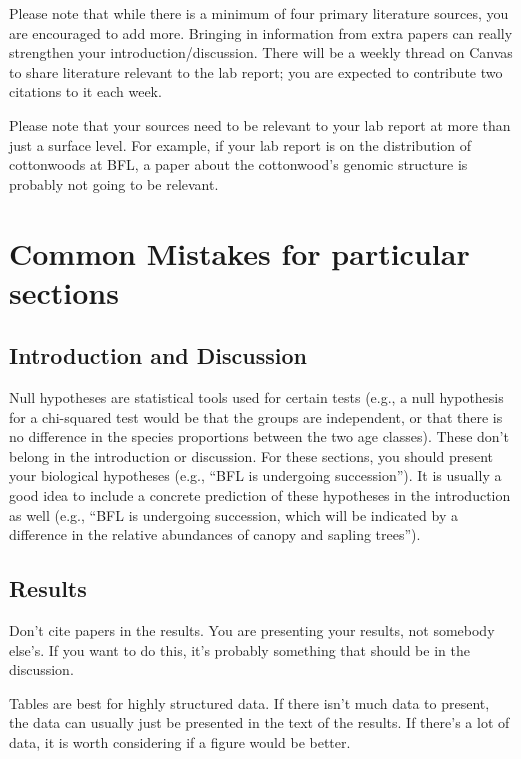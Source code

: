 \documentclass[]{book}
\begin{document}
Please note that while there is a minimum of four primary literature
sources, you are encouraged to add more. Bringing in information from
extra papers can really strengthen your introduction/discussion. There
will be a weekly thread on Canvas to share literature relevant to the
lab report; you are expected to contribute two citations to it each
week.

Please note that your sources need to be relevant to your lab report at
more than just a surface level. For example, if your lab report is on
the distribution of cottonwoods at BFL, a paper about the cottonwood's
genomic structure is probably not going to be relevant.

\section{Common Mistakes for particular
sections}\label{common-mistakes-for-particular-sections}

\subsection{Introduction and
Discussion}\label{introduction-and-discussion}

Null hypotheses are statistical tools used for certain tests (e.g., a
null hypothesis for a chi-squared test would be that the groups are
independent, or that there is no difference in the species proportions
between the two age classes). These don't belong in the introduction or
discussion. For these sections, you should present your biological
hypotheses (e.g., ``BFL is undergoing succession''). It is usually a
good idea to include a concrete prediction of these hypotheses in the
introduction as well (e.g., ``BFL is undergoing succession, which will
be indicated by a difference in the relative abundances of canopy and
sapling trees'').

\subsection{Results}\label{results-1}

Don't cite papers in the results. You are presenting your results, not
somebody else's. If you want to do this, it's probably something that
should be in the discussion.

Tables are best for highly structured data. If there isn't much data to
present, the data can usually just be presented in the text of the
results. If there's a lot of data, it is worth considering if a figure
would be better.
\end{document}
